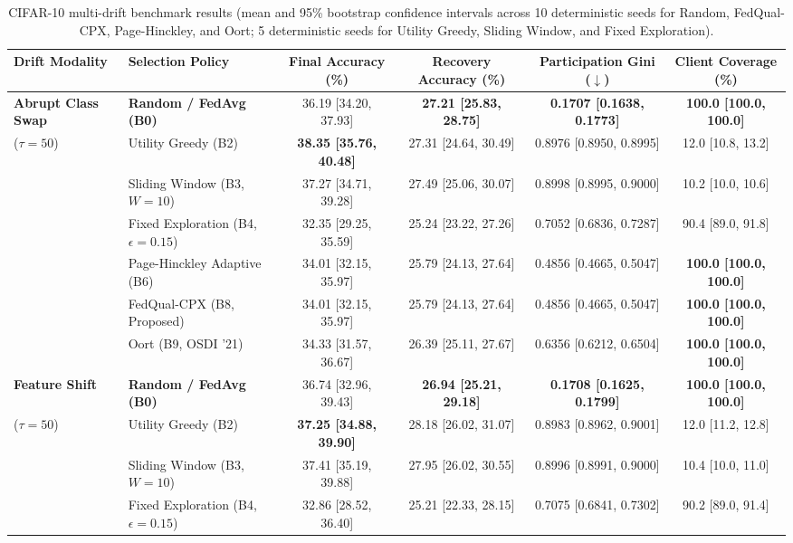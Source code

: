 \documentclass[conference]{IEEEtran}
\begin{document}
\begin{table}[t]
\centering
\caption{CIFAR-10 multi-drift benchmark results (mean and 95\% bootstrap confidence intervals across 10 deterministic seeds for Random, FedQual-CPX, Page-Hinckley, and Oort; 5 deterministic seeds for Utility Greedy, Sliding Window, and Fixed Exploration).}
\label{tab:cifar10_results}
\begin{tabular}{llcccc}
\toprule
Drift Modality & Selection Policy & Final Accuracy (\%) & Recovery Accuracy (\%) & Participation Gini ($\downarrow$) & Client Coverage (\%) \\
\midrule
\textbf{Abrupt Class Swap} & \textbf{Random / FedAvg (B0)} & 36.19 [34.20, 37.93] & \textbf{27.21 [25.83, 28.75]} & \textbf{0.1707 [0.1638, 0.1773]} & \textbf{100.0 [100.0, 100.0]} \\
($\tau = 50$) & Utility Greedy (B2) & \textbf{38.35 [35.76, 40.48]} & 27.31 [24.64, 30.49] & 0.8976 [0.8950, 0.8995] & 12.0 [10.8, 13.2] \\
& Sliding Window (B3, $W=10$) & 37.27 [34.71, 39.28] & 27.49 [25.06, 30.07] & 0.8998 [0.8995, 0.9000] & 10.2 [10.0, 10.6] \\
& Fixed Exploration (B4, $\epsilon=0.15$) & 32.35 [29.25, 35.59] & 25.24 [23.22, 27.26] & 0.7052 [0.6836, 0.7287] & 90.4 [89.0, 91.8] \\
& Page-Hinckley Adaptive (B6) & 34.01 [32.15, 35.97] & 25.79 [24.13, 27.64] & 0.4856 [0.4665, 0.5047] & \textbf{100.0 [100.0, 100.0]} \\
& FedQual-CPX (B8, Proposed) & 34.01 [32.15, 35.97] & 25.79 [24.13, 27.64] & 0.4856 [0.4665, 0.5047] & \textbf{100.0 [100.0, 100.0]} \\
& Oort (B9, OSDI '21) & 34.33 [31.57, 36.67] & 26.39 [25.11, 27.67] & 0.6356 [0.6212, 0.6504] & \textbf{100.0 [100.0, 100.0]} \\
\midrule
\textbf{Feature Shift} & \textbf{Random / FedAvg (B0)} & 36.74 [32.96, 39.43] & \textbf{26.94 [25.21, 29.18]} & \textbf{0.1708 [0.1625, 0.1799]} & \textbf{100.0 [100.0, 100.0]} \\
($\tau = 50$) & Utility Greedy (B2) & \textbf{37.25 [34.88, 39.90]} & 28.18 [26.02, 31.07] & 0.8983 [0.8962, 0.9001] & 12.0 [11.2, 12.8] \\
& Sliding Window (B3, $W=10$) & 37.41 [35.19, 39.88] & 27.95 [26.02, 30.55] & 0.8996 [0.8991, 0.9000] & 10.4 [10.0, 11.0] \\
& Fixed Exploration (B4, $\epsilon=0.15$) & 32.86 [28.52, 36.40] & 25.21 [22.33, 28.15] & 0.7075 [0.6841, 0.7302] & 90.2 [89.0, 91.4] \\

\end{tabular}
\end{table}
\end{document}
